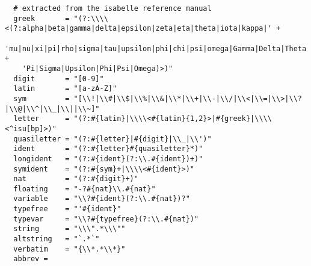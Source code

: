 \begin{lstlisting}
  # extracted from the isabelle reference manual
  greek       = "(?:\\\\<(?:alpha|beta|gamma|delta|epsilon|zeta|eta|theta|iota|kappa|' +
    'mu|nu|xi|pi|rho|sigma|tau|upsilon|phi|chi|psi|omega|Gamma|Delta|Theta|Lambda|Xi|' +
    'Pi|Sigma|Upsilon|Phi|Psi|Omega)>)"
  digit       = "[0-9]"
  latin       = "[a-zA-Z]"
  sym         = "[\\!|\\#|\\$|\\%|\\&|\\*|\\+|\\-|\\/|\\<|\\=|\\>|\\?|\\@|\\^|\\_|\\||\\~]"
  letter      = "(?:#{latin}|\\\\<#{latin}{1,2}>|#{greek}|\\\\<^isu[bp]>)"
  quasiletter = "(?:#{letter}|#{digit}|\\_|\\')"
  ident       = "(?:#{letter}#{quasiletter}*)"
  longident   = "(?:#{ident}(?:\\.#{ident})+)"
  symident    = "(?:#{sym}+|\\\\<#{ident}>)"
  nat         = "(?:#{digit}+)"
  floating    = "-?#{nat}\\.#{nat}"  
  variable    = "\\?#{ident}(?:\\.#{nat})?"
  typefree    = "'#{ident}"
  typevar     = "\\?#{typefree}(?:\\.#{nat})"
  string      = "\\\".*\\\""
  altstring   = "`.*`"
  verbatim    = "{\\*.*\\*}"  
  abbrev =

\end{lstlisting}
